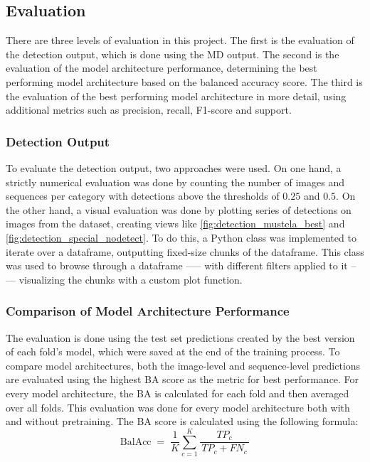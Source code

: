     \subsection{Evaluation}
    There are three levels of evaluation in this project.
    The first is the evaluation of the detection output, which is done using the \ac{MD} output.
    The second is the evaluation of the model architecture performance, determining the best performing model architecture based on the balanced accuracy score.
    The third is the evaluation of the best performing model architecture in more detail, using additional metrics such as precision, recall, F1-score and support.

    \subsubsection{Detection Output}
    To evaluate the detection output, two approaches were used.
    On one hand, a strictly numerical evaluation was done by counting the number of images and sequences per category with detections above the thresholds of \(0.25\) and \(0.5\).
    On the other hand, a visual evaluation was done by plotting series of detections on images from the dataset, creating views like \autoref{fig:detection_mustela_best} and \autoref{fig:detection_special_nodetect}.
    To do this, a Python class was implemented to iterate over a dataframe, outputting fixed-size chunks of the dataframe.
    This class was used to browse through a dataframe --— with different filters applied to it --— visualizing the chunks with a custom plot function.

    \subsubsection{Comparison of Model Architecture Performance}
    The evaluation is done using the test set predictions created by the best version of each fold's model, which were saved at the end of the training process.
    To compare model architectures, both the image-level and sequence-level predictions are evaluated using the highest \ac{BA} score as the metric for best performance.
    For every model architecture, the \ac{BA} is calculated for each fold and then averaged over all folds.
    This evaluation was done for every model architecture both with and without pretraining.
    The \ac{BA} score is calculated using the following formula:
    \begin{equation}
    \text{BalAcc}
    \;=\;
    \frac{1}{K} \sum_{c=1}^{K}
        \frac{TP_{c}}{\,TP_{c} + FN_{c}\,}
    \end{equation}

